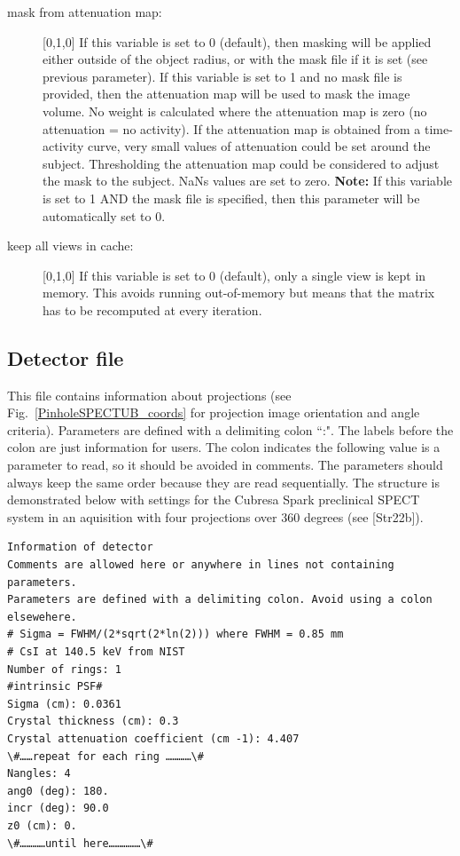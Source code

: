 \documentclass{article}
\begin{document}
{{\begin{description}
\item[mask from attenuation map:]  [0,1,0{]} If this variable is set to 0 (default), then masking will be applied either outside of the object radius, or with the mask file if it is set (see previous parameter). If this variable is set to 1 and no mask file is provided, then the attenuation map will be used to mask the image volume. No weight is calculated where the attenuation map is zero (no attenuation = no activity). If the attenuation map is obtained from a time-activity curve, very small values of attenuation could be set around the subject. Thresholding the attenuation map could be considered to adjust the mask to the subject. NaNs values are set to zero. \textbf{Note:} If this variable is set to 1 AND the mask file is specified, then this parameter will be automatically set to 0.

\item[keep all views in cache:] [0,1,0{]} If this variable is set to 0 (default), only a single view is kept in memory. This avoids running out-of-memory but means that the matrix has to be recomputed at every iteration.

\end{description}

{ {\subsection*{{Detector file} }
This file contains information about projections (see Fig.~\ref{PinholeSPECTUB_coords} for projection image orientation and angle criteria). Parameters are defined with a delimiting colon ``:". The labels before the colon are just information for users. The colon indicates the following value is a parameter to read, so it should be avoided in comments. The parameters should always keep the same order because they are read sequentially. The structure is demonstrated below with settings for the Cubresa Spark preclinical SPECT system in an aquisition with four projections over 360 degrees (see [Str22b]).

\begin{verbatim}
Information of detector
Comments are allowed here or anywhere in lines not containing parameters.
Parameters are defined with a delimiting colon. Avoid using a colon elsewehere.
# Sigma = FWHM/(2*sqrt(2*ln(2))) where FWHM = 0.85 mm
# CsI at 140.5 keV from NIST
Number of rings: 1
#intrinsic PSF#
Sigma (cm): 0.0361
Crystal thickness (cm): 0.3
Crystal attenuation coefficient (cm -1): 4.407   
\#……repeat for each ring …………\#
Nangles: 4
ang0 (deg): 180.
incr (deg): 90.0
z0 (cm): 0.
\#…………until here……………\#
\end{verbatim}

}}}}
\end{document}
